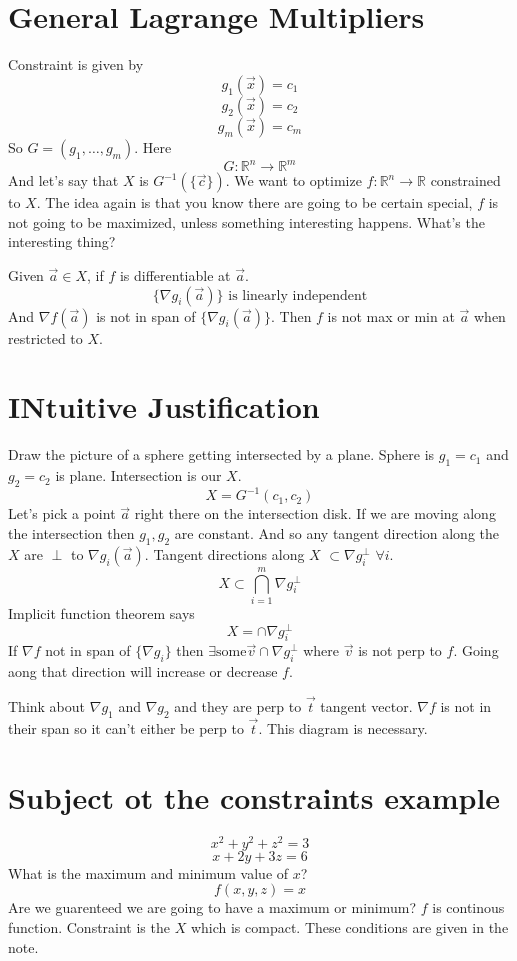 \documentclass[letter]{article}
\begin{document}
\section*{General Lagrange Multipliers} 
Constraint is given by $$g_1(\vec{x}) = c_1$$
\[
g_2(\vec{x}) = c_2
\] 
\[
g_m (\vec{x}) = c_m
\] 
So $G = (g_1, \ldots, g_m)$. Here 
\[
G: \mathbb{R}^{n} \to \mathbb{R}^{m}
\] 
And let's say that $X$ is $G^{-1} (\{\vec{c}\} )$. We want to optimize $f: \mathbb{R}^{n}\to \mathbb{R}$ constrained to $X$. The idea again is that you know there are going to be certain special, $f $ is not going to be maximized, unless something interesting happens. What's the interesting thing? 

Given $\vec{a} \in X$, if $f$ is differentiable at $\vec{a}$. 
\[
\{\nabla g_i (\vec{a})\} \text{ is linearly independent}
\]
And $\nabla f(\vec{a})$ is not in span of $\{\nabla g_i(\vec{a})\} $. Then $f$ is not max or min at $\vec{a}$ when restricted to $X$. 

\section*{INtuitive Justification} 
Draw the picture of a sphere getting intersected by a plane. Sphere is $g_1 = c_1$ and $g_2 = c_2$ is plane. Intersection is our $X$. 
\[
X = G^{-1} ( c_1, c_2)
\] 
Let's pick a point $\vec{a}$ right there on the intersection disk. If we are moving along the intersection then $g_1, g_2$ are constant. And so any tangent direction along the $X$ are $\perp$ to $\nabla g_i (\vec{a})$. Tangent directions along $X$ $\subset  \nabla g_i ^{\perp }$ $\forall i$. 
\[
	X \subset \bigcap_{i=1}^m \nabla g_i^{\perp} 
\]
Implicit function theorem says
\[
X = \cap  \nabla g_i ^{\perp}
\]
If $\nabla f$ not in span of $\{\nabla g_i\} $ then $\exists \text{some} \vec{v} \cap \nabla g_i^{\perp}$ where $\vec{v}$ is not perp to $f$. Going aong that direction will increase or decrease $f$. 

Think about $\nabla g_1$ and $\nabla g_2$ and they are perp to $\vec{t}$ tangent vector. $\nabla f$ is not in their span so it can't either be perp to $\vec{t}$. This diagram is necessary. 

\section*{Subject ot the constraints example}
\[
x^2 + y^2 + z^2 = 3
\] 
\[
x + 2y + 3z = 6
\] 
What is the maximum and minimum value of $x$? 
\[
f(x,y,z) = x
\] 
Are we guarenteed we are going to have a maximum or minimum? $f$ is continous function. Constraint is the $X$ which is compact. 
These conditions are given in the note. 
\end{document}
